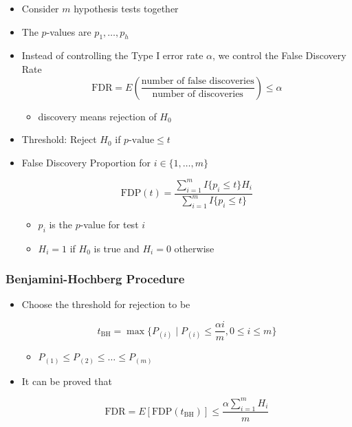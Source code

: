 \documentclass[
]{book}
\providecommand{\tightlist}{%
  \setlength{\itemsep}{0pt}\setlength{\parskip}{0pt}}
\begin{document}
\begin{itemize}
\item
  Consider \(m\) hypothesis tests together
\item
  The \(p\)-values are \(p_1, \dots, p_h\)
\item
  Instead of controlling the Type I error rate \(\alpha\),
  we control the False Discovery Rate
  \[\mathrm{FDR} 
  = E \left( \frac{\text{number of false discoveries}}{\text{number of discoveries}} \right)
  \leq \alpha\]

  \begin{itemize}
  \tightlist
  \item
    discovery means rejection of \(H_0\)
  \end{itemize}
\item
  Threshold: Reject \(H_0\) if \(p\text{-value} \leq t\)
\item
  False Discovery Proportion for \(i \in \{1, \dots, m\}\)

  \[\mathrm{FDP}(t) = \frac{\sum_{i = 1}^m I\{p_i \leq t\} H_i}{\sum_{i = 1}^m I\{p_i \leq t\}}\]

  \begin{itemize}
  \tightlist
  \item
    \(p_i\) is the \(p\)-value for test \(i\)
  \item
    \(H_i = 1\) if \(H_0\) is true and \(H_i = 0\) otherwise
  \end{itemize}
\end{itemize}

\hypertarget{benjamini-hochberg-procedure}{%
\subsubsection{Benjamini-Hochberg Procedure}\label{benjamini-hochberg-procedure}}

\begin{itemize}
\item
  Choose the threshold for rejection to be

  \[t_{\mathrm{BH}} = \max \{P_{(i)} \mid P_{(i)} \leq \frac{\alpha i}{m}, 0 \leq i \leq m\}\]

  \begin{itemize}
  \tightlist
  \item
    \(P_{(1)} \leq P_{(2)} \leq \dots \leq P_{(m)}\)
  \end{itemize}
\item
  It can be proved that

  \[\mathrm{FDR} = E[\mathrm{FDP}(t_{\mathrm{BH}})] 
  \leq \frac{\alpha \sum_{i=1}^m H_i}{m}\]
\end{itemize}
\end{document}
